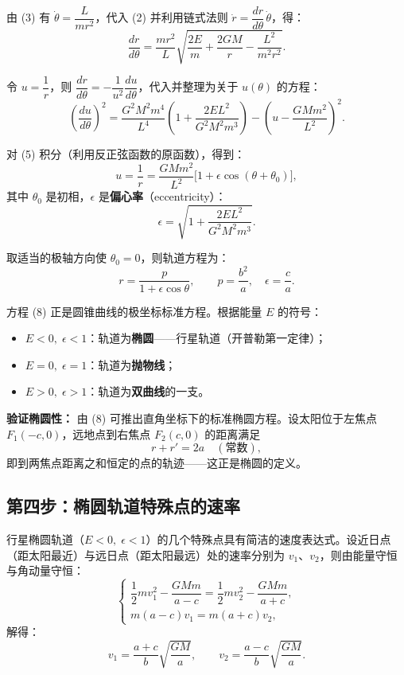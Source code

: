 \documentclass[12pt,a4paper]{article}
\begin{document}
由 (3) 有 $\dot{\theta} = \dfrac{L}{mr^2}$，代入 (2) 并利用链式法则 $\dot{r} = \dfrac{dr}{d\theta}\,\dot{\theta}$，得：
\[
\frac{dr}{d\theta} = \frac{mr^2}{L}\sqrt{\frac{2E}{m} + \frac{2GM}{r} - \frac{L^2}{m^2r^2}}.
\tag{4}
\]

令 $u = \dfrac{1}{r}$，则 $\dfrac{dr}{d\theta} = -\dfrac{1}{u^2}\dfrac{du}{d\theta}$，代入并整理为关于 $u(\theta)$ 的方程：
\[
\left( \frac{du}{d\theta} \right)^2 = \frac{G^2M^2m^4}{L^4}\left( 1 + \frac{2EL^2}{G^2M^2m^3} \right) - \left( u - \frac{GMm^2}{L^2} \right)^2.
\tag{5}
\]

对 (5) 积分（利用反正弦函数的原函数），得到：
\[
u = \frac{1}{r} = \frac{GMm^2}{L^2}\bigl[ 1 + \epsilon\cos(\theta + \theta_0) \bigr],
\tag{6}
\]
其中 $\theta_0$ 是初相，$\epsilon$ 是\textbf{偏心率}（eccentricity）：
\[
\epsilon = \sqrt{1 + \frac{2EL^2}{G^2M^2m^3}}.
\tag{7}
\]

取适当的极轴方向使 $\theta_0 = 0$，则轨道方程为：
\[
\boxed{r = \frac{p}{1 + \epsilon\cos\theta}},\qquad
p = \frac{b^2}{a},\quad \epsilon = \frac{c}{a}.
\tag{8}
\]

方程 (8) 正是圆锥曲线的极坐标标准方程。根据能量 $E$ 的符号：

\begin{itemize}
  \item $E < 0,\; \epsilon < 1$：轨道为\textbf{椭圆}——行星轨道（开普勒第一定律）；
  \item $E = 0,\; \epsilon = 1$：轨道为\textbf{抛物线}；
  \item $E > 0,\; \epsilon > 1$：轨道为\textbf{双曲线}的一支。
\end{itemize}

\textbf{验证椭圆性：} 由 (8) 可推出直角坐标下的标准椭圆方程。设太阳位于左焦点 $F_1(-c,0)$，远地点到右焦点 $F_2(c,0)$ 的距离满足
\[
r + r' = 2a \quad (\text{常数}),
\]
即到两焦点距离之和恒定的点的轨迹——这正是椭圆的定义。

\subsection{第四步：椭圆轨道特殊点的速率}

行星椭圆轨道（$E<0,\;\epsilon<1$）的几个特殊点具有简洁的速度表达式。设近日点（距太阳最近）与远日点（距太阳最远）处的速率分别为 $v_1$、$v_2$，则由能量守恒与角动量守恒：
\[
\begin{cases}
\dfrac{1}{2}mv_1^2 - \dfrac{GMm}{a-c} = \dfrac{1}{2}mv_2^2 - \dfrac{GMm}{a+c},\\[8pt]
m(a-c)v_1 = m(a+c)v_2,
\end{cases}
\]
解得：
\[
v_1 = \frac{a+c}{b}\sqrt{\frac{GM}{a}},\qquad
v_2 = \frac{a-c}{b}\sqrt{\frac{GM}{a}}.
\tag{9}
\]
\end{document}
